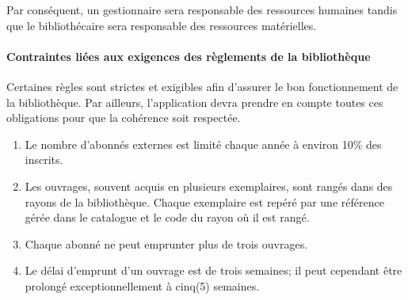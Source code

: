 Par conséquent, un gestionnaire sera responsable des ressources humaines tandis que
le bibliothécaire sera responsable des ressources matérielles.
    
\paragraph{Contraintes liées aux exigences des règlements de la bibliothèque}
Certaines règles sont strictes et exigibles afin d’assurer le bon fonctionnement 
de la bibliothèque. Par ailleurs, l’application devra prendre en compte toutes
 ces obligations pour que la cohérence soit respectée. \par
 \begin{enumerate}
     \item Le nombre d’abonnés externes est limité chaque année à environ 
     10\% des inscrits.
     \item Les ouvrages, souvent acquis en plusieurs exemplaires, sont 
     rangés dans des rayons de la bibliothèque. Chaque exemplaire est repéré 
     par une référence gérée dans le catalogue et le code du rayon où il est rangé.
     \item Chaque abonné ne peut emprunter plus de trois ouvrages.
     \item Le délai d’emprunt d’un ouvrage est de trois semaines; il peut 
     cependant être prolongé exceptionnellement à cinq(5) semaines.
 \end{enumerate}